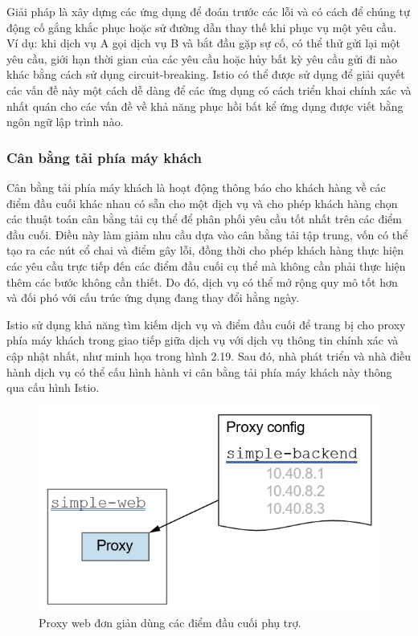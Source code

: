 \documentclass[14pt,a4paper]{book}
\begin{document}
Giải pháp là xây dựng các ứng dụng để đoán trước các lỗi và có cách để chúng tự động cố gắng khắc phục hoặc sử đường dẫn thay thế khi phục vụ một yêu cầu. Ví dụ: khi dịch vụ A gọi dịch vụ B và bắt đầu gặp sự cố, có thể thử gửi lại một yêu cầu, giới hạn thời gian của các yêu cầu hoặc hủy bất kỳ yêu cầu gửi đi nào khác bằng cách sử dụng circuit-breaking. Istio có thể được sử dụng để giải quyết các vấn đề này một cách dễ dàng để các ứng dụng có cách triển khai chính xác và nhất quán cho các vấn đề về khả năng phục hồi bất kể ứng dụng được viết bằng ngôn ngữ lập trình nào.

			\subsubsection{Cân bằng tải phía máy khách}
\hspace{0.6cm}Cân bằng tải phía máy khách là hoạt động thông báo cho khách hàng về các điểm đầu cuối khác nhau có sẵn cho một dịch vụ và cho phép khách hàng chọn các thuật toán cân bằng tải cụ thể để phân phối yêu cầu tốt nhất trên các điểm đầu cuối. Điều này làm giảm nhu cầu dựa vào cân bằng tải tập trung, vốn có thể tạo ra các nút cổ chai và điểm gây lỗi, đồng thời cho phép khách hàng thực hiện các yêu cầu trực tiếp đến các điểm đầu cuối cụ thể mà không cần phải thực hiện thêm các bước không cần thiết. Do đó, dịch vụ có thể mở rộng quy mô tốt hơn và đối phó với cấu trúc ứng dụng đang thay đổi hằng ngày.

Istio sử dụng khả năng tìm kiếm dịch vụ và điểm đầu cuối để trang bị cho proxy phía máy khách trong giao tiếp giữa dịch vụ với dịch vụ thông tin chính xác và cập nhật nhất, như minh họa trong hình 2.19. Sau đó, nhà phát triển và nhà điều hành dịch vụ có thể cấu hình hành vi cân bằng tải phía máy khách này thông qua cấu hình Istio.
\begin{figure}[h]
	\centering
	\includegraphics[width=0.7\linewidth]{Pics/2.2.3-p2}
	\caption{Proxy web đơn giản dùng các điểm đầu cuối phụ trợ.}
	\label{fig:2.2.3-2}
\end{figure}
\end{document}
